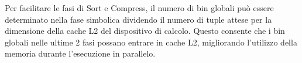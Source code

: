 Per facilitare le fasi di Sort e Compress, il numero di bin globali può essere determinato nella fase simbolica 
dividendo il numero di tuple attese per la dimensione della cache L2 del dispositivo di calcolo.
Questo consente che i bin globali nelle ultime 2 fasi possano entrare in cache L2, 
migliorando l'utilizzo della memoria durante l'esecuzione in parallelo.\\









